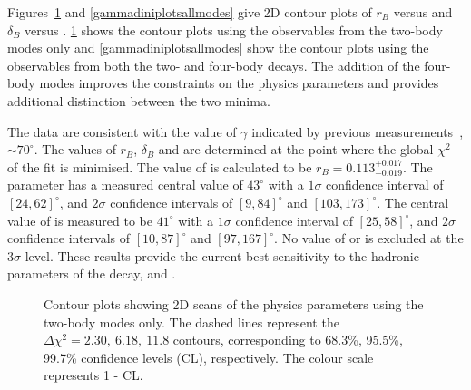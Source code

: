 Figures~\ref{gammadiniplots2body} and \ref{gammadiniplotsallmodes} give 2D contour plots of $r_B$ versus \Pgamma and $\delta_B$ versus \Pgamma. \Fig\ref{gammadiniplots2body} shows the contour plots using the \CP observables from the two-body modes only and \fig\ref{gammadiniplotsallmodes} show the contour plots using the \CP observables from both the two- and four-body decays. The addition of the four-body modes improves the constraints on the physics parameters and provides additional distinction between the two minima. 

The data are consistent with the value of $\gamma$ indicated by previous measurements~\cite{LHCb-PAPER-2016-032, CKMFitter}, $\sim 70^\circ$. The values of $r_B$, $\delta_B$ and \Pgamma are determined at the point where the global $\chi^2$ of the fit is minimised. The value of \rb is calculated to be $r_B = 0.113^{+0.017}_{-0.019}$. The parameter \deltab has a measured central value of $43^{\circ}$ with a $1\sigma$ confidence interval of $[24, 62]^{\circ}$, and $2\sigma$ confidence intervals of $[9, 84]^{\circ}$ and $[103,173]^{\circ}$. The central value of \Pgamma is measured to be $41^{\circ}$ with a $1\sigma$ confidence interval of $[25, 58]^{\circ}$, and $2\sigma$ confidence intervals of $[10, 87]^{\circ}$ and $[97,167]^{\circ}$. No value of \Pgamma or \deltab is excluded at the $3\sigma$ level. These results provide the current best sensitivity to the hadronic parameters of the \Bm decay, \rb and \deltab.

\begin{figure}[h]
\centering
{}
\caption{Contour plots showing 2D scans of the physics parameters using the two-body modes only. The dashed lines represent the $\Delta \chi^2 = 2.30,\ 6.18,\ 11.8$ contours, corresponding to 68.3\%, 95.5\%, 99.7\% confidence levels (CL), respectively. The colour scale represents 1 - CL.}
\label{gammadiniplots2body}
\end{figure}

